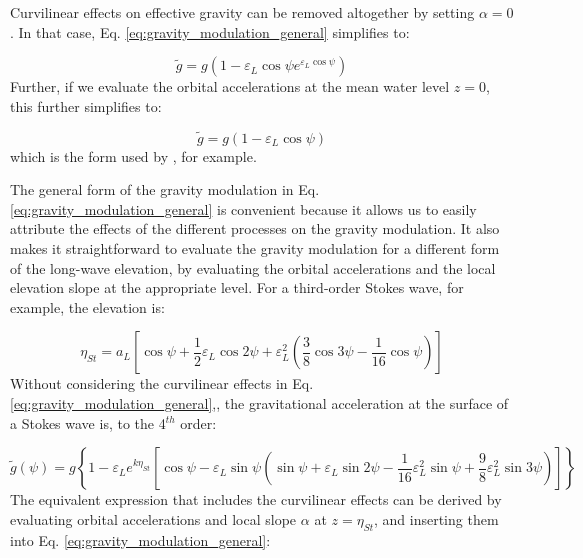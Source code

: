 \documentclass[lineno]{jfm}
\begin{document}
Curvilinear effects on effective gravity can be removed altogether by setting
$\alpha = 0$.
In that case, Eq. \ref{eq:gravity_modulation_general} simplifies to:

\begin{equation}
\label{eq:gravity_modulation_linear_no_curvature}
\widetilde{g} = g \left( 1 - \varepsilon_L \cos{\psi} e^{\varepsilon_L \cos{\psi}} \right)
\end{equation}
Further, if we evaluate the orbital accelerations at the mean water level $z=0$,
this further simplifies to:

\begin{equation}
\label{eq:gravity_modulation_linear_no_curvature_mean_level}
\widetilde{g} = g \left( 1 - \varepsilon_L \cos{\psi} \right)
\end{equation}
which is the form used by \citet{peureux2021unsteady}, for example.

The general form of the gravity modulation in Eq. \ref{eq:gravity_modulation_general}
is convenient because it allows us to easily attribute the effects of the different
processes on the gravity modulation.
It also makes it straightforward to evaluate the gravity modulation for a different
form of the long-wave elevation, by evaluating the orbital accelerations and the
local elevation slope at the appropriate level.
For a third-order Stokes wave, for example, the elevation is:

\begin{equation}
\label{eq:eta_stokes}
\eta_{St} = a_L \left[
  \cos{\psi} +
  \dfrac{1}{2} \varepsilon_L \cos{2\psi} +
  \varepsilon_L^2 \left( \dfrac{3}{8} \cos{3\psi} - \dfrac{1}{16} \cos{\psi} \right)
\right]
\end{equation}
Without considering the curvilinear effects in Eq. \ref{eq:gravity_modulation_general},,
the gravitational acceleration at the surface of a Stokes wave is, to the
4$^{th}$ order:

\begin{equation}
\label{eq:gravity_modulation_stokes}
\widetilde{g}(\psi) =
g \left\{
  1 - \varepsilon_L e^{k \eta_{St}}
  \left[ \cos{\psi} -
    \varepsilon_L \sin{\psi} \left(
      \sin{\psi}
      + \varepsilon_L \sin{2\psi}
      - \dfrac{1}{16} \varepsilon_L^2 \sin{\psi}
      + \dfrac{9}{8} \varepsilon_L^2 \sin{3\psi}
    \right)
  \right]
\right\}
\end{equation}
The equivalent expression that includes the curvilinear effects can be derived
by evaluating orbital accelerations and local slope $\alpha$ at $z = \eta_{St}$,
and inserting them into Eq. \ref{eq:gravity_modulation_general}:
\end{document}
